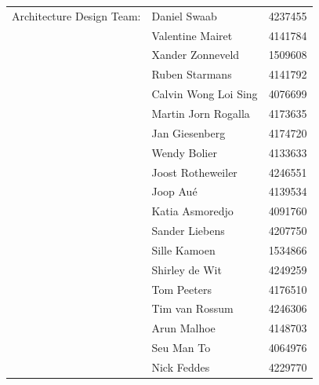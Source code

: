 \begin{titlepage}
\begin{center}
\begin{tabular}{lll}
    Architecture Design Team: & Daniel Swaab & 4237455\\
        & Valentine Mairet     & 4141784\\
        & Xander Zonneveld     & 1509608\\
        & Ruben Starmans       & 4141792\\
        & Calvin Wong Loi Sing & 4076699\\
        & Martin Jorn Rogalla  & 4173635\\
        & Jan Giesenberg       & 4174720\\
        & Wendy Bolier         & 4133633\\
        & Joost Rotheweiler    & 4246551\\
        & Joop Aué             & 4139534\\
        & Katia Asmoredjo      & 4091760\\
        & Sander Liebens       & 4207750\\
        & Sille Kamoen         & 1534866\\
        & Shirley de Wit       & 4249259\\
        & Tom Peeters          & 4176510\\
        & Tim van Rossum       & 4246306\\
        & Arun Malhoe          & 4148703\\
        & Seu Man To           & 4064976\\
        & Nick Feddes          & 4229770
\end{tabular}

\bigskip
\bigskip

\bigskip
\bigskip

\end{center}

\end{titlepage}
